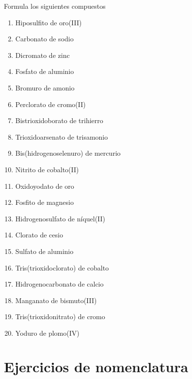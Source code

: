 \documentclass[10pt,a5paper,twoside]{article}
\begin{document}
\begin{exercise}[
    tags    = {inorgánica,sales, sales ternarias, oxosales,2B},
    topics  = {química inorgánica,formulación,nomenclatura},
    source  = {Química 2B OXF 2016, p347, e12},
  ]
  Formula los siguientes compuestos

  \begin{enumerate}
    \item Hiposulfito de oro(III)
    \item Carbonato de sodio
    \item Dicromato de zinc
    \item Fosfato de aluminio
    \item Bromuro de amonio
    \item Perclorato de cromo(II)
    \item Bistrioxidoborato de trihierro
    \item Trioxidoarsenato de trisamonio
    \item Bis(hidrogenoselenuro) de mercurio
    \item Nitrito de cobalto(II)
    \item Oxidoyodato de oro
    \item Fosfito de magnesio
    \item Hidrogenosulfato de níquel(II)
    \item Clorato de cesio
    \item Sulfato de aluminio
    \item Tris(trioxidoclorato) de cobalto
    \item Hidrogenocarbonato de calcio
    \item Manganato de bismuto(III)
    \item Tris(trioxidonitrato) de cromo
    \item Yoduro de plomo(IV)
  \end{enumerate}
\end{exercise}














\section{Ejercicios de nomenclatura}
\end{document}
